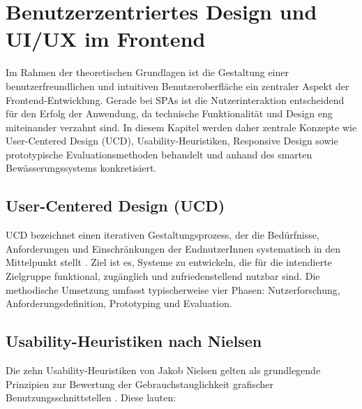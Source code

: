 \section{Benutzerzentriertes Design und UI/UX im Frontend}
\label{chap:uiux}

Im Rahmen der theoretischen Grundlagen ist die Gestaltung einer benutzerfreundlichen und intuitiven Benutzeroberfläche ein zentraler Aspekt der Frontend-Entwicklung. Gerade bei \acp{SPA} ist die Nutzerinteraktion entscheidend für den Erfolg der Anwendung, da technische Funktionalität und Design eng miteinander verzahnt sind. In diesem Kapitel werden daher zentrale Konzepte wie User-Centered Design (UCD), Usability-Heuristiken, Responsive Design sowie prototypische Evaluationsmethoden behandelt und anhand des smarten Bewässerungssystems konkretisiert.

\subsection{User-Centered Design (UCD)}

\ac{UCD} bezeichnet einen iterativen Gestaltungsprozess, der die Bedürfnisse, Anforderungen und Einschränkungen der EndnutzerInnen systematisch in den Mittelpunkt stellt \cite{IxDF_UCD2025}. Ziel ist es, Systeme zu entwickeln, die für die intendierte Zielgruppe funktional, zugänglich und zufriedenstellend nutzbar sind. Die methodische Umsetzung umfasst typischerweise vier Phasen: Nutzerforschung, Anforderungsdefinition, Prototyping und Evaluation.

\subsection{Usability-Heuristiken nach Nielsen}

Die zehn Usability-Heuristiken von Jakob Nielsen gelten als grundlegende Prinzipien zur Bewertung der Gebrauchstauglichkeit grafischer Benutzungsschnittstellen \cite{Guimaraes2021}. Diese lauten:

